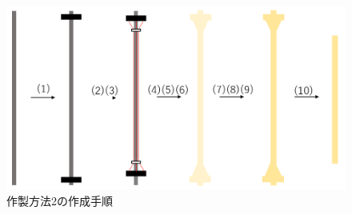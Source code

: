 \begin{figure}[t]
  \centering  %
  \vspace{20mm}
  \includegraphics[scale=0.4]{pic/19.PNG}
  \caption{作製方法2の作成手順}
  \label{fig:21}
\end{figure}




